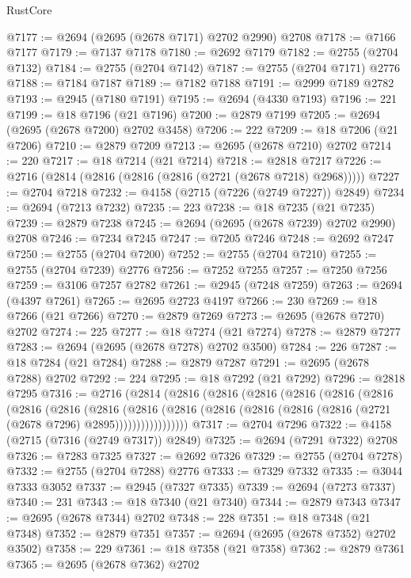 \begin{lexlean}{RustCore}
\begin{coremodule}
@7177 := @2694 (@2695 (@2678 @7171) @2702 @2990) @2708
@7178 := @7166 @7177
@7179 := @7137 @7178
@7180 := @2692 @7179
@7182 := @2755 (@2704 @7132)
@7184 := @2755 (@2704 @7142)
@7187 := @2755 (@2704 @7171) @2776
@7188 := @7184 @7187
@7189 := @7182 @7188
@7191 := @2999 @7189 @2782
@7193 := @2945 (@7180 @7191)
@7195 := @2694 (@4330 @7193)
@7196 := 221
@7199 := @18 @7196 (@21 @7196)
@7200 := @2879 @7199
@7205 := @2694 (@2695 (@2678 @7200) @2702 @3458)
@7206 := 222
@7209 := @18 @7206 (@21 @7206)
@7210 := @2879 @7209
@7213 := @2695 (@2678 @7210) @2702
@7214 := 220
@7217 := @18 @7214 (@21 @7214)
@7218 := @2818 @7217
@7226 := @2716 (@2814 (@2816 (@2816 (@2816 (@2721 (@2678 @7218) @2968)))))
@7227 := @2704 @7218
@7232 := @4158 (@2715 (@7226 (@2749 @7227)) @2849)
@7234 := @2694 (@7213 @7232)
@7235 := 223
@7238 := @18 @7235 (@21 @7235)
@7239 := @2879 @7238
@7245 := @2694 (@2695 (@2678 @7239) @2702 @2990) @2708
@7246 := @7234 @7245
@7247 := @7205 @7246
@7248 := @2692 @7247
@7250 := @2755 (@2704 @7200)
@7252 := @2755 (@2704 @7210)
@7255 := @2755 (@2704 @7239) @2776
@7256 := @7252 @7255
@7257 := @7250 @7256
@7259 := @3106 @7257 @2782
@7261 := @2945 (@7248 @7259)
@7263 := @2694 (@4397 @7261)
@7265 := @2695 @2723 @4197
@7266 := 230
@7269 := @18 @7266 (@21 @7266)
@7270 := @2879 @7269
@7273 := @2695 (@2678 @7270) @2702
@7274 := 225
@7277 := @18 @7274 (@21 @7274)
@7278 := @2879 @7277
@7283 := @2694 (@2695 (@2678 @7278) @2702 @3500)
@7284 := 226
@7287 := @18 @7284 (@21 @7284)
@7288 := @2879 @7287
@7291 := @2695 (@2678 @7288) @2702
@7292 := 224
@7295 := @18 @7292 (@21 @7292)
@7296 := @2818 @7295
@7316 := @2716
    (@2814
      (@2816
        (@2816
          (@2816
            (@2816
              (@2816
                (@2816
                  (@2816
                    (@2816
                      (@2816
                        (@2816
                          (@2816
                            (@2816 (@2816 (@2816 (@2816 (@2721 (@2678 @7296) @2895)))))))))))))))))
@7317 := @2704 @7296
@7322 := @4158 (@2715 (@7316 (@2749 @7317)) @2849)
@7325 := @2694 (@7291 @7322) @2708
@7326 := @7283 @7325
@7327 := @2692 @7326
@7329 := @2755 (@2704 @7278)
@7332 := @2755 (@2704 @7288) @2776
@7333 := @7329 @7332
@7335 := @3044 @7333 @3052
@7337 := @2945 (@7327 @7335)
@7339 := @2694 (@7273 @7337)
@7340 := 231
@7343 := @18 @7340 (@21 @7340)
@7344 := @2879 @7343
@7347 := @2695 (@2678 @7344) @2702
@7348 := 228
@7351 := @18 @7348 (@21 @7348)
@7352 := @2879 @7351
@7357 := @2694 (@2695 (@2678 @7352) @2702 @3502)
@7358 := 229
@7361 := @18 @7358 (@21 @7358)
@7362 := @2879 @7361
@7365 := @2695 (@2678 @7362) @2702

\end{coremodule}
\end{lexlean}
